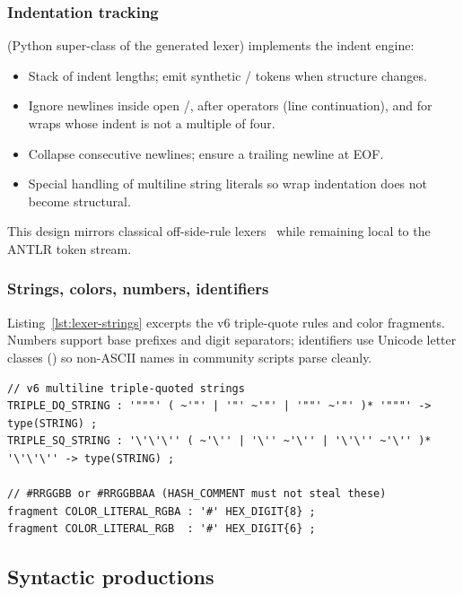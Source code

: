 \documentclass[11pt,a4paper]{article}
\begin{document}
\subsubsection{Indentation tracking}
 (Python super-class of the generated lexer)
implements the indent engine:

\begin{itemize}[leftmargin=*]
  \item Stack of indent lengths; emit synthetic /
    tokens when structure changes.
  \item Ignore newlines inside open \code{(}/\code{[}, after operators (line
    continuation), and for wraps whose indent is not a multiple of four.
  \item Collapse consecutive newlines; ensure a trailing newline at EOF.
  \item Special handling of multiline string literals so wrap indentation does
    not become structural.
\end{itemize}

This design mirrors classical off-side-rule lexers~\citep{aho2006dragon} while
remaining local to the ANTLR token stream.

\subsubsection{Strings, colors, numbers, identifiers}
Listing~\ref{lst:lexer-strings} excerpts the v6 triple-quote rules and color
fragments. Numbers support base prefixes and digit separators; identifiers use
Unicode letter classes () so non-ASCII names in
community scripts parse cleanly.

\begin{lstlisting}[style=pine,caption={Lexer excerpts: triple-quoted strings and color literals (simplified from \texttt{PinescriptLexer.g4}).},label={lst:lexer-strings},language={}]
// v6 multiline triple-quoted strings
TRIPLE_DQ_STRING : '"""' ( ~'"' | '"' ~'"' | '""' ~'"' )* '"""' -> type(STRING) ;
TRIPLE_SQ_STRING : '\'\'\'' ( ~'\'' | '\'' ~'\'' | '\'\'' ~'\'' )* '\'\'\'' -> type(STRING) ;

// #RRGGBB or #RRGGBBAA (HASH_COMMENT must not steal these)
fragment COLOR_LITERAL_RGBA : '#' HEX_DIGIT{8} ;
fragment COLOR_LITERAL_RGB  : '#' HEX_DIGIT{6} ;
\end{lstlisting}

\subsection{Syntactic productions}
\label{sec:syntax}
\end{document}
